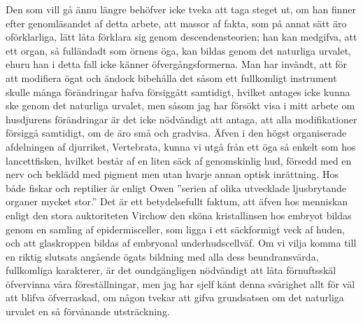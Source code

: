 Den som vill gå ännu längre behöfver icke tveka att taga steget ut, om han finner efter genomläsandet af detta arbete, att massor af fakta, som på annat sätt äro oförklarliga, lätt låta förklara sig genom descendensteorien; han kan medgifva, att ett organ, så fulländadt som örnens öga, kan bildas genom det naturliga urvalet, ehuru han i detta fall icke känner öfvergångsformerna. Man har invändt, att för att modifiera ögat och ändock bibehålla det såsom ett fullkomligt instrument skulle många förändringar hafva försiggått samtidigt, hvilket antages icke kunna ske genom det naturliga urvalet, men såsom jag har försökt visa i mitt arbete om husdjurens förändringar är det icke nödvändigt att antaga, att alla modifikationer försiggå samtidigt, om de äro små och gradvisa. Äfven i den högst organiserade afdelningen af djurriket, Vertebrata, kunna vi utgå från ett öga så enkelt som hos lancettfisken, hvilket består af en liten säck af genomskinlig hud, försedd med en nerv och beklädd med pigment men utan hvarje annan optisk inrättning. Hos både fiskar och reptilier är enligt Owen ”serien af olika utvecklade ljusbrytande organer mycket stor.” Det är ett betydelsefullt faktum, att äfven hos menniskan enligt den stora auktoriteten Virchow den sköna kristallinsen hos embryot bildas genom en samling af epidermisceller, som ligga i ett säckformigt veck af huden, och att glaskroppen bildas af embryonal underhudscellväf. Om vi vilja komma till en riktig slutsats angående ögats bildning med alla dess beundransvärda, fullkomliga karakterer, är det oundgängligen nödvändigt att låta förnuftsskäl öfvervinna våra föreställningar, men jag har sjelf känt denna svårighet allt för väl att blifva öfverraskad, om någon tvekar att gifva grundsatsen om det naturliga urvalet en så förvånande utsträckning.

